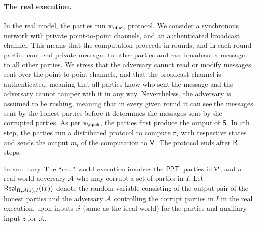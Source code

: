 \paragraph{The real execution.} In the real model, the parties run $\pi_\dpzk$ protocol.  We consider a synchronous network with private point-to-point channels, and an authenticated broadcast channel. This means that the computation proceeds in rounds, and in each round parties can send private messages to other parties and can broadcast a message to all other parties. We stress that the adversary cannot read or modify messages sent over the point-to-point channels, and that the broadcast channel is authenticated, meaning that all parties know who sent the message and the adversary cannot tamper with it in any way. Nevertheless, the adversary is assumed to be rushing, meaning that in every given round it can see the messages sent by the honest parties before it determines the messages sent by the corrupted parties. As per $\pi_\dpzk$, the parties first produce the output of $\mathsf{S}$. In $r$th step, the parties run a distributed protocol to compute $\pi_i$ with respective states and sends the output $m_i$ of the computation to $\mathsf{V}$.  The protocol ends after $\mathsf{R}$ steps.

In summary.  The ``real" world execution involves the $\mathsf{PPT}$\ parties  in $\mathcal{P}$,  and a real world adversary $\mathcal{A}$ who may corrupt  a set of parties in $I$.  Let $\mathsf{Real}_{\Pi, \mathcal{A}(z),I}(\vec(x))$ denote the random variable consisting of the output pair of the honest parties and the adversary $\mathcal{A}$ controlling the corrupt parties in $I$ in the real execution, upon inputs $\vec{x}$ (same as the ideal world) for the parties and auxiliary input $z$ for $\mathcal{A}$. 


